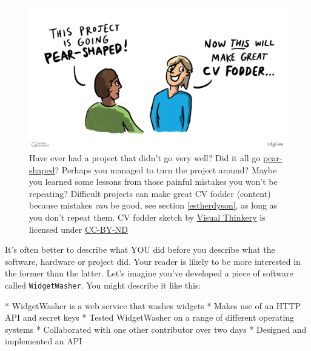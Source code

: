 \documentclass[
]{book}
\newenvironment{Shaded}{\begin{snugshade}}{\end{snugshade}}
\newcommand{\NormalTok}[1]{#1}
\newcommand{\SpecialStringTok}[1]{\textcolor[rgb]{0.31,0.60,0.02}{#1}}
\begin{document}
\begin{figure}

{\centering \includegraphics[width=0.98\linewidth]{images/CV Fodder} 

}

\caption{Have ever had a project that didn't go very well? Did it all go \href{https://en.wikipedia.org/wiki/Pear-shaped}{pear-shaped}? Perhaps you managed to turn the project around? Maybe you learned some lessons from those painful mistakes you won't be repeating? Difficult projects can make great CV fodder (content) because mistakes \emph{can} be good, see section \ref{estherdyson}, as long as you don't repeat them. CV fodder sketch by \href{https://visualthinkery.com/}{Visual Thinkery} is licensed under \href{https://creativecommons.org/licenses/by-nd/4.0/}{CC-BY-ND}}\label{fig:cvfodder-fig}
\end{figure}



It's often better to describe what YOU did before you describe what the software, hardware or project did. Your reader is likely to be more interested in the former than the latter. Let's imagine you've developed a piece of software called \texttt{WidgetWasher}. You might describe it like this:

\begin{Shaded}
\begin{Highlighting}[]
\SpecialStringTok{* }\NormalTok{WidgetWasher is a web service that washes widgets}
\SpecialStringTok{* }\NormalTok{Makes use of an HTTP API and secret keys}
\SpecialStringTok{* }\NormalTok{Tested WidgetWasher on a range of different operating systems}
\SpecialStringTok{* }\NormalTok{Collaborated with one other contributor over two days}
\SpecialStringTok{* }\NormalTok{Designed and implemented an API}
\end{Highlighting}
\end{Shaded}
\end{document}
